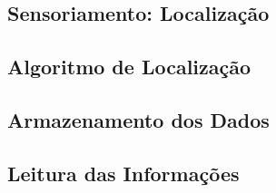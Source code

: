   \subsection{Sensoriamento: Localização}

  \subsection{Algoritmo de Localização}

  \subsection{Armazenamento dos Dados}

  \subsection{Leitura das Informações}
